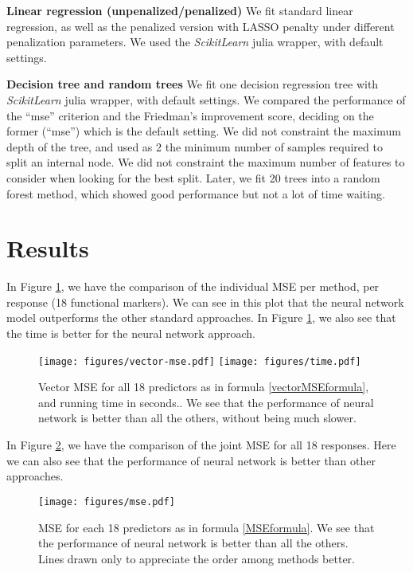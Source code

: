 \documentclass[graybox]{svmult}
\begin{document}
\vspace{0.25cm}
\noindent \textbf{Linear regression (unpenalized/penalized)} We fit standard
linear regression, as well as the penalized version with LASSO penalty
under different penalization parameters. We used the
\textit{ScikitLearn} julia wrapper, with default settings.

\vspace{0.25cm}
\noindent \textbf{Decision tree and random trees} We fit one decision
regression tree with \textit{ScikitLearn} julia wrapper, with default
settings. We compared the performance of the ``mse'' criterion and the
Friedman's improvement score, deciding on the former (``mse'') which
is the default setting. We did not constraint the maximum depth of the
tree, and used as 2 the minimum number of samples required to split an
internal node. We did not constraint the maximum number of features to
consider when looking for the best split. Later, we fit 20 trees into
a random forest method, which showed good performance but not a lot of
time waiting.


\section{Results}

In Figure \ref{vectorMSE}, we have the comparison of the individual
MSE per method, per response (18 functional markers). We can see in
this plot that the neural network model outperforms the other standard
approaches. In Figure \ref{vectorMSE}, we also see that the time is
better for the neural network approach.

\begin{figure}
\centering
\texttt{[image: figures/vector-mse.pdf]}
\texttt{[image: figures/time.pdf]}
\caption{Vector MSE for all 18 predictors as in formula
  \ref{vectorMSEformula}, and running time in seconds.. We see that
  the performance of neural network is better than all the
  others, without being much slower.}
\label{vectorMSE}
\end{figure}

In Figure \ref{MSE}, we have the comparison of the joint MSE for all 18
responses. Here we can also see that the performance of neural network
is better than other approaches.

\begin{figure}
\centering
\texttt{[image: figures/mse.pdf]}
\caption{MSE for each 18 predictors as in formula
  \ref{MSEformula}. We see that the performance of neural
  network is better than all the others. Lines drawn only to
  appreciate the order among methods better.}
\label{MSE}
\end{figure}
\end{document}
